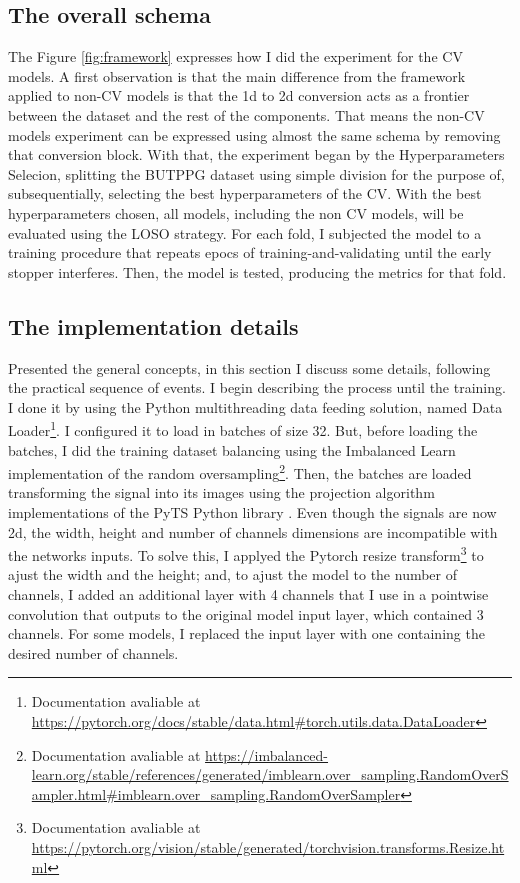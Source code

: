 \subsection{The overall schema}



The Figure \ref{fig:framework} expresses how I did the experiment for the \acrshort{CV} models. A first observation is that the main difference from the framework applied to non-\acrshort{CV} models is that the 1d to 2d conversion acts as a frontier between the dataset and the rest of the components. That means the non-\acrshort{CV} models experiment can be expressed using almost the same schema by removing that conversion block. With that, the experiment began by the Hyperparameters Selecion, splitting the \acrshort{BUTPPG} dataset using simple division for the purpose of, subsequentially, selecting the best hyperparameters of the \acrshort{CV}. With the best hyperparameters chosen, all models, including the non \acrshort{CV} models, will be evaluated using the \acrshort{LOSO} strategy. For each fold, I subjected the model to a training procedure that repeats epocs of training-and-validating until the early stopper interferes. Then, the model is tested, producing the metrics for that fold.

\subsection{The implementation details}

Presented the general concepts, in this section I discuss some details, following the practical sequence of events. I begin describing the process until the training. I done it by using the Python multithreading data feeding solution, named Data Loader\footnote{Documentation avaliable at \url{https://pytorch.org/docs/stable/data.html\#torch.utils.data.DataLoader}}. I configured it to load in batches of size 32. But, before loading the batches, I did the training dataset balancing using the Imbalanced Learn \cite{ImbalancedLearn} implementation of the random oversampling\footnote{Documentation avaliable at \url{https://imbalanced-learn.org/stable/references/generated/imblearn.over_sampling.RandomOverSampler.html\#imblearn.over_sampling.RandomOverSampler}}. Then, the batches are loaded transforming the signal into its images using the projection algorithm implementations of the PyTS Python library \cite{PyTS}. Even though the signals are now 2d, the width, height and number of channels dimensions are incompatible with the networks inputs. To solve this, I applyed the Pytorch resize transform\footnote{Documentation avaliable at \url{https://pytorch.org/vision/stable/generated/torchvision.transforms.Resize.html}} to ajust the width and the height; and, to ajust the model to the number of channels, I added an additional layer with 4 channels that I use in a pointwise convolution that outputs to the original model input layer, which contained 3 channels. For some models, I replaced the input layer with one containing the desired number of channels.

